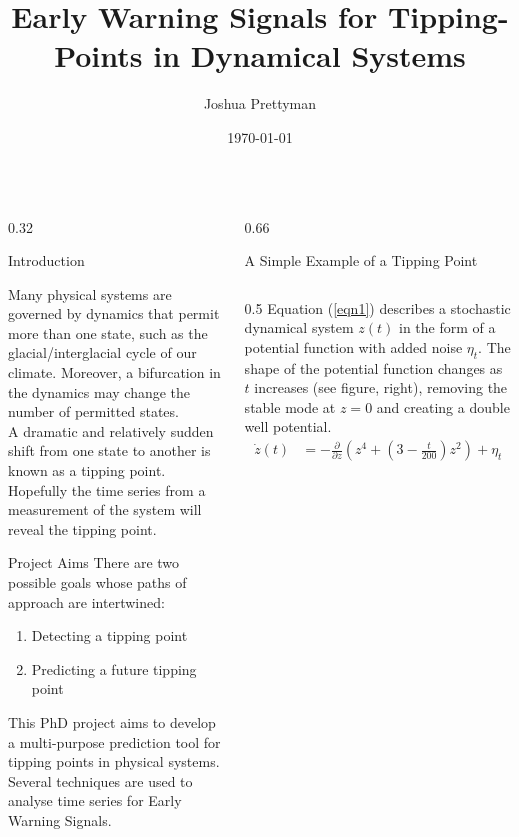 \documentclass[11pt, final]{beamer}
\title[I like to make posters]{Early Warning Signals for Tipping-Points in Dynamical Systems}
\author[T]{Joshua Prettyman}
\institute[SMS]{University of Reading\\ National Physical Laboratory}
\date{\today}
\begin{document}
\begin{frame}{} 
  \begin{columns}[T]
    \begin{column}{0.32\textwidth}
    		\begin{block}{Introduction}
    		
    		Many physical systems are governed by dynamics that permit more than one state, such as the glacial/interglacial cycle of our climate. Moreover, a bifurcation in the dynamics may change the number of permitted states. \\
    		\vspace{1cm}
    		A dramatic and relatively sudden shift from one state to another is known as a tipping point. Hopefully the time series from a measurement of the system will reveal the tipping point. 
		
    		\end{block}
    		
    		\begin{block}{Project Aims}
    		There are two possible goals whose paths of approach are intertwined:
    		\vspace{1cm}
    			\begin{enumerate}
    			\setlength{\itemindent}{3em}
    			\item Detecting a tipping point
    			\item Predicting a future tipping point
    			\end{enumerate}
    		\vspace{1cm}
    		This PhD project aims to develop a multi-purpose prediction tool for tipping points in physical systems. Several techniques are used to analyse time series for Early Warning Signals.
    		\end{block}
    		
    \end{column}
    \begin{column}{0.66\textwidth}
    
    
    \begin{block}{A Simple Example of a Tipping Point}
    \begin{columns}[T]
    		\begin{column}{0.5\textwidth}
    Equation (\ref{eqn1}) describes a stochastic dynamical system $z(t)$ in the form of a potential function with added noise $\eta_t$. The shape of the potential function changes as $t$ increases (see figure, right), removing the stable mode at $z=0$ and creating a double well potential.
    \vspace{0.5cm}
\begin{align}
\dot{z}(t) & = -\frac{\partial}{\partial z}(z^4 + \left(3-\frac{t}{200}\right)z^2) + \eta_t
\label{eqn1}
\end{align}
\vspace{0.5cm}


\end{column}
\end{columns}
\end{block}
\end{column}
\end{columns}
\end{frame}
\end{document}
